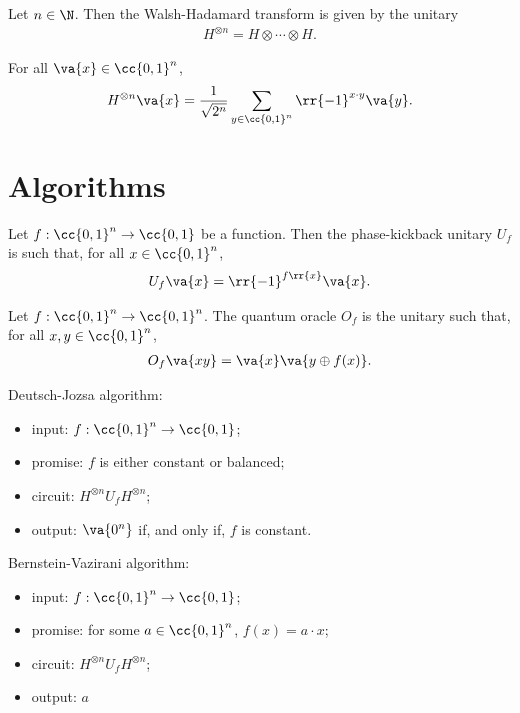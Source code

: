 \documentclass{article}
\begin{document}
\begin{definition}
  Let $n\in\N$. Then the Walsh-Hadamard transform is given by the unitary
  \begin{align*}
    H^{\otimes n} = H\otimes \cdots \otimes H.
  \end{align*}
\end{definition}

\begin{lemma}
  For all $\va{x}\in\cc{0,1}^n$,
  \begin{align*}
    H^{\otimes n} \va{x} = \frac{1}{\sqrt{2^n}} \sum_{y\in\cc{0,1}^n} \rr{-1}^{x\cdot y}\va{y}.
  \end{align*}
\end{lemma}

\section{Algorithms}

\begin{definition}
  Let $f:\cc{0,1}^n\to \cc{0,1}$ be a function. Then the phase-kickback unitary
  $U_f$ is such that, for all $x\in\cc{0,1}^n$,
  \begin{align*}
    U_f \va{x}= \rr{-1}^{f\rr{x}}\va{x}.
  \end{align*}
\end{definition}

\begin{definition}
  Let $f:\cc{0,1}^n\to\cc{0,1}^n$. The quantum oracle $O_f$ is the unitary
  such that, for all $x,y\in\cc{0,1}^n$,
  \begin{align*}
    O_f \va{xy} = \va{x}\va{y \oplus f(x)}.
  \end{align*}
\end{definition}

\begin{algorithm}
  Deutsch-Jozsa algorithm:
  \begin{itemize}
    \item input: $f:\cc{0,1}^n\to\cc{0,1}$;
    \item promise: $f$ is either constant or balanced;
    \item circuit: $H^{\otimes n} U_f H^{\otimes n}$;
    \item output: $\va{0^n}$ if, and only if, $f$ is constant.
  \end{itemize}
\end{algorithm}

\begin{algorithm}
  Bernstein-Vazirani algorithm:
  \begin{itemize}
    \item input: $f:\cc{0,1}^n\to\cc{0,1}$;
    \item promise: for some $a\in\cc{0,1}^n$, $f(x) = a\cdot x$;
    \item circuit: $H^{\otimes n} U_f H^{\otimes n}$;
    \item output: $a$
  \end{itemize}
\end{algorithm}
\end{document}
